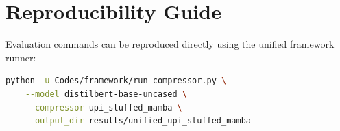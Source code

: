 \section{Reproducibility Guide}
Evaluation commands can be reproduced directly using the unified framework runner:
\begin{lstlisting}[language=bash]
python -u Codes/framework/run_compressor.py \
    --model distilbert-base-uncased \
    --compressor upi_stuffed_mamba \
    --output_dir results/unified_upi_stuffed_mamba
\end{lstlisting}
